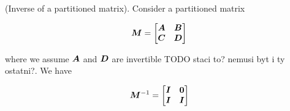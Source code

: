 \begin{thm} (Inverse of a partitioned matrix). Consider a partitioned matrix

\begin{equation}
{\bm{M}} = \begin{bmatrix} {\bm{A}} & {\bm{B}} \\ {\bm{C}} & {\bm{D}} \end{bmatrix}
\end{equation}

where we assume ${\bm{A}}$ and ${\bm{D}}$ are invertible {TODO staci to? nemusi byt i ty ostatni?}. We have

\begin{equation}
{\bm{M}}^{-1} = \begin{bmatrix} {\bm{I}} & {\bm{0}} \\ {\bm{I}} & {\bm{I}} \end{bmatrix}
\end{equation}
\end{thm}

